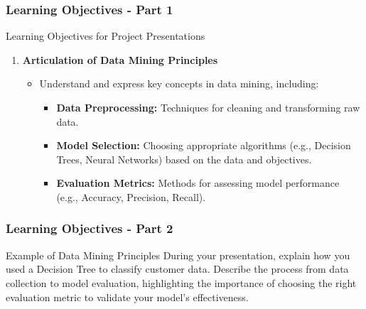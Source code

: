 \documentclass[aspectratio=169]{beamer}
\begin{document}
\begin{frame}[fragile]
    \frametitle{Learning Objectives - Part 1}
    \begin{block}{Learning Objectives for Project Presentations}
        \begin{enumerate}
            \item \textbf{Articulation of Data Mining Principles}
                \begin{itemize}
                    \item Understand and express key concepts in data mining, including:
                        \begin{itemize}
                            \item \textbf{Data Preprocessing:} Techniques for cleaning and transforming raw data.
                            \item \textbf{Model Selection:} Choosing appropriate algorithms (e.g., Decision Trees, Neural Networks) based on the data and objectives.
                            \item \textbf{Evaluation Metrics:} Methods for assessing model performance (e.g., Accuracy, Precision, Recall).
                        \end{itemize}
                \end{itemize}
        \end{enumerate}
    \end{block}
\end{frame}

\begin{frame}[fragile]
    \frametitle{Learning Objectives - Part 2}
    \begin{block}{Example of Data Mining Principles}
        During your presentation, explain how you used a Decision Tree to classify customer data. Describe the process from data collection to model evaluation, highlighting the importance of choosing the right evaluation metric to validate your model's effectiveness.
    \end{block}
\end{frame}
\end{document}
